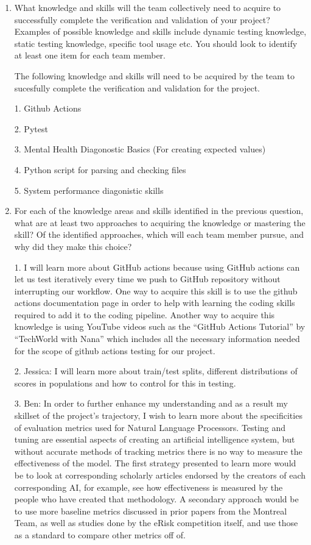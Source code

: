\documentclass[12pt, titlepage]{article}
\begin{document}
\begin{enumerate}
  \item What knowledge and skills will the team collectively need to acquire to
  successfully complete the verification and validation of your project?
  Examples of possible knowledge and skills include dynamic testing knowledge,
  static testing knowledge, specific tool usage etc.  You should look to
  identify at least one item for each team member.

The following knowledge and skills will need to be acquired by the team to sucesfully
complete the verification and validation for the project.

1. Github Actions

2. Pytest

3. Mental Health Diagonostic Basics (For creating expected values)

4. Python script for parsing and checking files

5. System performance diagonistic skills

  \item For each of the knowledge areas and skills identified in the previous
  question, what are at least two approaches to acquiring the knowledge or
  mastering the skill?  Of the identified approaches, which will each team
  member pursue, and why did they make this choice?

1. I will learn more about GitHub actions because using GitHub actions can let us test iteratively every time we push to GitHub repository without interrupting our workflow. One way to acquire this skill is to use the github actions documentation page in order to help with learning the coding skills required to add it to the coding pipeline. Another way to acquire this knowledge is using YouTube videos such as the “GitHub Actions Tutorial” by “TechWorld with Nana” which includes all the necessary information needed for the scope of github actions testing for our project.

2. Jessica: I will learn more about train/test splits, different distributions of scores in populations and how to control for this in testing.

3. Ben: In order to further enhance my understanding and as a result my skillset of the project’s trajectory, I wish to learn more about the specificities of evaluation metrics used for Natural Language Processors. Testing and tuning are essential aspects of creating an artificial intelligence system, but without accurate methods of tracking metrics there is no way to measure the effectiveness of the model. The first strategy presented to learn more would be to look at corresponding scholarly articles endorsed by the creators of each corresponding AI, for example, see how effectiveness is measured by the people who have created that methodology. A secondary approach would be to use more baseline metrics discussed in prior papers from the Montreal Team, as well as studies done by the eRisk competition itself, and use those as a standard to compare other metrics off of.


\end{enumerate}
\end{document}
